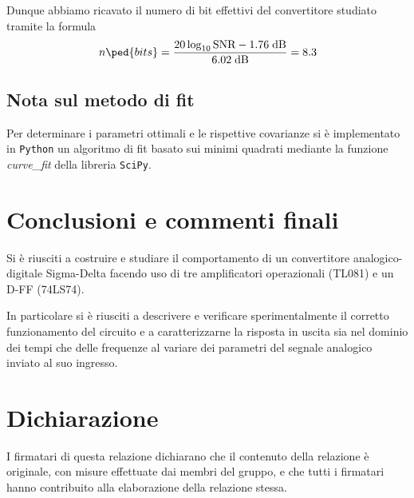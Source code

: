 \documentclass[10pt, a4paper, italian]{article}
\begin{document}
Dunque abbiamo ricavato il numero di bit effettivi del convertitore studiato
tramite la formula
\begin{equation}\label{eq: effbit}
n\ped{bits} = \frac{20\log_{10}{\text{SNR}} - 1.76 \; \si{dB}}
{6.02 \; \si{dB}} = 8.3
\end{equation}

\subsection*{Nota sul metodo di fit}
Per determinare i parametri ottimali e le rispettive covarianze si \`e
implementato in \verb+Python+ un algoritmo di fit basato sui minimi quadrati
mediante la funzione \emph{curve\_fit} della libreria \texttt{SciPy}.

\section*{Conclusioni e commenti finali}
Si è riusciti a costruire e studiare il comportamento di un convertitore
analogico-digitale Sigma-Delta facendo uso di tre amplificatori
operazionali (TL081) e un D-FF (74LS74).

In particolare si è riusciti a descrivere e verificare sperimentalmente il
corretto funzionamento del circuito e a caratterizzarne la risposta in uscita
sia nel dominio dei tempi che delle frequenze al variare dei parametri del
segnale analogico inviato al suo ingresso.

\section*{Dichiarazione}
I firmatari di questa relazione dichiarano che il contenuto della relazione \`e
originale, con misure effettuate dai membri del gruppo, e che tutti i firmatari
hanno contribuito alla elaborazione della relazione stessa.
\end{document}

